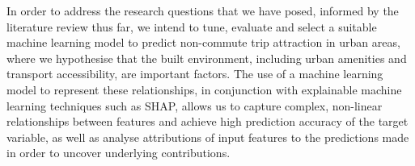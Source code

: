 In order to address the research questions that we have posed, informed by the literature review thus far, we intend to tune, evaluate and select a suitable machine learning model to predict non-commute trip attraction in urban areas, where we hypothesise that the built environment, including urban amenities and transport accessibility, are important factors. The use of a machine learning model to represent these relationships, in conjunction with explainable machine learning techniques such as SHAP, allows us to capture complex, non-linear relationships between features and achieve high prediction accuracy of the target variable, as well as analyse attributions of input features to the predictions made in order to uncover underlying contributions.